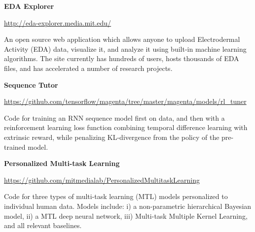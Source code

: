 \documentclass[paper=letter,fontsize=11pt]{scrartcl} %
\newcommand{\sepspace}{\vspace*{1em}}		%
\newcommand{\EducationEntry}[3]{
		\noindent \textbf{#1} \hfill      %
		\colorbox{White}{%
			\parbox{10em}{%
			\hfill\color{Black}#2}} \par  %
		\noindent \textit{#3} \par}
\newcommand{\OpenSourceEntry}[3]{				  %
		\noindent \textbf{#1}  \par    %
		\noindent \url{#2} \par            %
		\noindent #3 \par %
        }
\begin{document}
\OpenSourceEntry{EDA Explorer}{http://eda-explorer.media.mit.edu/}{An open source web application which allows anyone to upload Electrodermal Activity (EDA) data, visualize it, and analyze it using built-in machine learning algorithms. The site currently has hundreds of users, hosts thousands of EDA files, and has accelerated a number of research projects.}
\sepspace

\OpenSourceEntry{Sequence Tutor}{https://github.com/tensorflow/magenta/tree/master/magenta/models/rl_tuner}{Code for training an RNN sequence model first on data, and then with a reinforcement learning loss function combining temporal difference learning with extrinsic reward, while penalizing KL-divergence from the policy of the pre-trained model.}
\sepspace

\OpenSourceEntry{Personalized Multi-task Learning}{https://github.com/mitmedialab/PersonalizedMultitaskLearning}{Code for three types of multi-task learning (MTL) models personalized to individual human data. Models include: i) a non-parametric hierarchical Bayesian model, ii) a MTL deep neural network, iii) Multi-task Multiple Kernel Learning, and all relevant baselines.}
\end{document}
